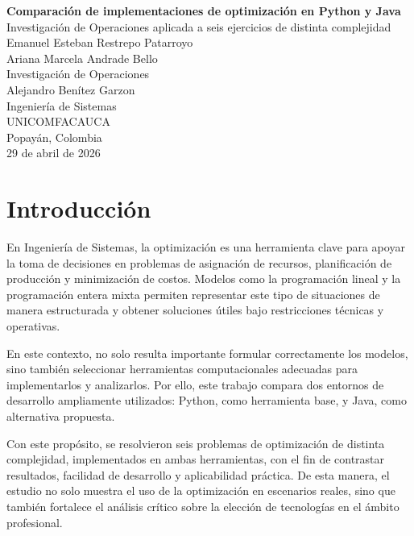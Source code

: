 \documentclass[12pt,letterpaper]{article}
\begin{document}
\begin{titlepage}
	\centering
	\vspace*{2cm}

	{\Large \textbf{Comparación de implementaciones de optimización en Python y Java}}\\[0.5cm]
	{\large Investigación de Operaciones aplicada a seis ejercicios de distinta complejidad}\\[2cm]

	Emanuel Esteban Restrepo Patarroyo\\
	Ariana Marcela Andrade Bello\\[0.8cm]

	Investigación de Operaciones\\
	Alejandro Benítez Garzon\\[0.8cm]

	Ingeniería de Sistemas\\
	UNICOMFACAUCA\\[0.8cm]


	\vfill
	{\large Popayán, Colombia}\\
	{\large 29 de abril de 2026}
\end{titlepage}

\tableofcontents
\listoftables
\newpage

\section{Introducción}

En Ingeniería de Sistemas, la optimización es una herramienta clave para apoyar la toma de decisiones en problemas de asignación de recursos, planificación de producción y minimización de costos. Modelos como la programación lineal y la programación entera mixta permiten representar este tipo de situaciones de manera estructurada y obtener soluciones útiles bajo restricciones técnicas y operativas.

En este contexto, no solo resulta importante formular correctamente los modelos, sino también seleccionar herramientas computacionales adecuadas para implementarlos y analizarlos. Por ello, este trabajo compara dos entornos de desarrollo ampliamente utilizados: Python, como herramienta base, y Java, como alternativa propuesta.

Con este propósito, se resolvieron seis problemas de optimización de distinta complejidad, implementados en ambas herramientas, con el fin de contrastar resultados, facilidad de desarrollo y aplicabilidad práctica. De esta manera, el estudio no solo muestra el uso de la optimización en escenarios reales, sino que también fortalece el análisis crítico sobre la elección de tecnologías en el ámbito profesional.
\end{document}
